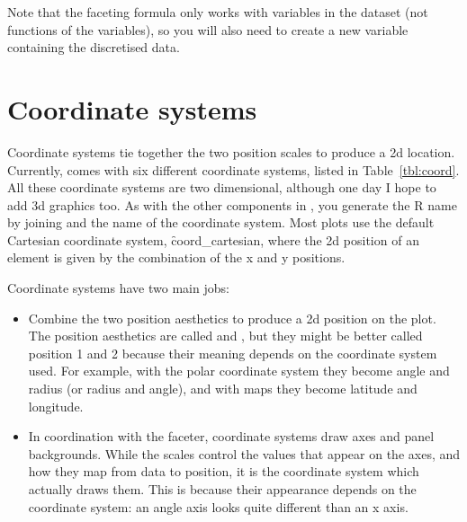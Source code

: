 Note that the faceting formula only works with variables in the dataset (not functions of the variables), so you will also need to create a new variable containing the discretised data.

\section{Coordinate systems}
\label{sec:coord}

Coordinate systems tie together the two position scales to produce a 2d location. Currently, \ggplot comes with six different coordinate systems, listed in Table~\ref{tbl:coord}.  All these coordinate systems are two dimensional, although one day I hope to add 3d graphics too. As with the other components in \ggplot, you generate the R name by joining  and the name of the coordinate system.  Most plots use the default Cartesian coordinate system, \f{coord_cartesian}, where the 2d position of an element is given by the combination of the x and y positions.  

Coordinate systems have two main jobs: 

\begin{itemize}
  \item Combine the two position aesthetics to produce a 2d position on the plot.  The position aesthetics are called  and , but they might be better called position 1 and 2 because their meaning depends on the coordinate system used.  For example, with the polar coordinate system they become angle and radius (or radius and angle), and with maps they become latitude and longitude.
  
  \item In coordination with the faceter, coordinate systems draw axes and panel backgrounds.  While the scales control the values that appear on the axes, and how they map from data to position, it is the coordinate system which actually draws them.  This is because their appearance depends on the coordinate system: an angle axis looks quite different than an x axis. 

\end{itemize}


